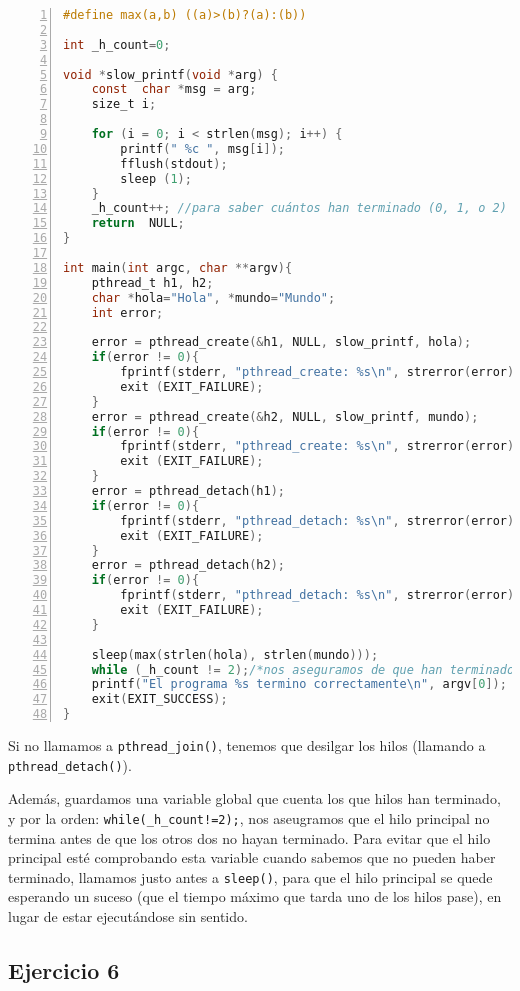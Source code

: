 \documentclass{article}
\begin{document}
\begin{lstlisting}[language=C, texcl=true, numbers=left]
#define max(a,b) ((a)>(b)?(a):(b))

int _h_count=0;

void *slow_printf(void *arg) {
    const  char *msg = arg;
    size_t i;
    
    for (i = 0; i < strlen(msg); i++) {
        printf(" %c ", msg[i]);
        fflush(stdout);
        sleep (1);
    }    
    _h_count++; //para saber cuántos han terminado (0, 1, o 2)
    return  NULL;
}

int main(int argc, char **argv){
    pthread_t h1, h2;
    char *hola="Hola", *mundo="Mundo";
    int error;

    error = pthread_create(&h1, NULL, slow_printf, hola);
    if(error != 0){
        fprintf(stderr, "pthread_create: %s\n", strerror(error));
        exit (EXIT_FAILURE);
    }
    error = pthread_create(&h2, NULL, slow_printf, mundo);
    if(error != 0){
        fprintf(stderr, "pthread_create: %s\n", strerror(error));
        exit (EXIT_FAILURE);
    }
    error = pthread_detach(h1);
    if(error != 0){
        fprintf(stderr, "pthread_detach: %s\n", strerror(error));
        exit (EXIT_FAILURE);
    }
    error = pthread_detach(h2);
    if(error != 0){
        fprintf(stderr, "pthread_detach: %s\n", strerror(error));
        exit (EXIT_FAILURE);
    }

    sleep(max(strlen(hola), strlen(mundo))); 
    while (_h_count != 2);/*nos aseguramos de que han terminado*/
    printf("El programa %s termino correctamente\n", argv[0]);
    exit(EXIT_SUCCESS);
}
\end{lstlisting}

Si no llamamos a \texttt{pthread\_join()}, tenemos que desilgar los hilos (llamando a \texttt{pthread\_detach()}).

Además, guardamos una variable global que cuenta los que hilos han terminado, y por la orden: \texttt{while(\_h\_count!=2);}, nos aseugramos que el hilo principal no termina antes de que los otros dos no hayan terminado. Para evitar que el hilo principal esté comprobando esta variable cuando sabemos que no pueden haber terminado, llamamos justo antes a \texttt{sleep()}, para que el hilo principal se quede esperando un suceso (que el tiempo máximo que tarda uno de los hilos pase), en lugar de estar ejecutándose sin sentido.


\subsection*{Ejercicio 6}
\end{document}
